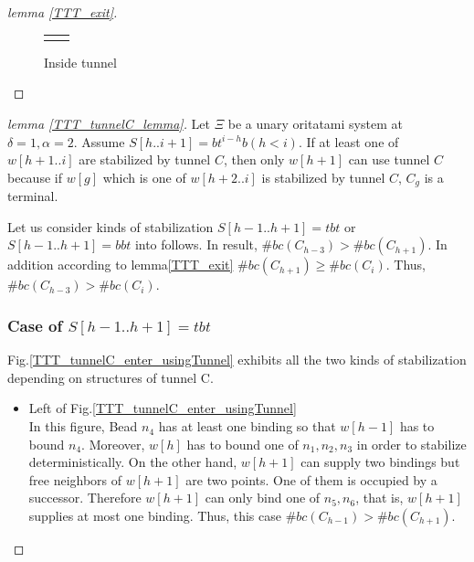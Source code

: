 \documentclass[runningheads]{llncs}
\begin{document}
\begin{proof}[lemma \ref{TTT_exit}]
\begin{figure}
\begin{tabular}{cc}
\begin{minipage}{0.33\hsize}
    \caption{Inside tunnel}
    \label{TTT_inside_tunnel}
    \end{minipage}
 
    \end{tabular}
\end{figure}
\end{proof}

\begin{proof}[lemma \ref{TTT_tunnelC_lemma}]
Let $\Xi$ be a unary oritatami system at $\delta = 1, \alpha = 2$.
Assume $S[h..i+1] = bt^{i-h}b (h<i)$. If at least one of $w[h+1..i]$ are stabilized by tunnel $C$, then only $w[h+1]$ can use tunnel $C$ because if $w[g]$ which is one of $w[h+2..i]$ is stabilized by tunnel $C$, $C_g$ is a terminal.


Let us consider kinds of stabilization $S[h-1..h+1] = tbt$ or $S[h-1..h+1] = bbt$ into follows. In result, $\#bc(C_{h-3}) > \#bc(C_{h+1})$. In addition according to lemma\ref{TTT_exit} $\#bc(C_{h+1}) \geq \#bc(C_{i})$. Thus, $\#bc(C_{h-3}) > \#bc(C_{i})$.
\\

\subsubsection{Case of $S[h-1..h+1] = tbt$}
Fig.\ref{TTT_tunnelC_enter_usingTunnel} exhibits all the two kinds of stabilization depending on structures of tunnel C.

\begin{itemize}
\item{Left of Fig.\ref{TTT_tunnelC_enter_usingTunnel}}\\
  In this figure, Bead $n_4$ has at least one binding so that $w[h-1]$ has to bound $n_4$. Moreover, $w[h]$ has to bound one of $n_1, n_2, n_3$ in order to stabilize deterministically. On the other hand, $w[h+1]$ can supply two bindings but free neighbors of $w[h+1]$ are two points. One of them is occupied by a successor. Therefore $w[h+1]$ can only bind one of $n_5, n_6$, that is, $w[h+1]$ supplies at most one binding. Thus, this case $\#bc(C_{h-1}) > \#bc(C_{h+1})$.


\end{itemize}
\end{proof}
\end{document}
